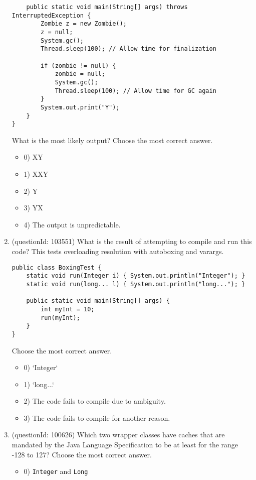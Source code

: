 \documentclass[12pt]{article}
\begin{document}
\begin{enumerate}[label=(\arabic*)]
\begin{verbatim}
    public static void main(String[] args) throws InterruptedException {
        Zombie z = new Zombie();
        z = null;
        System.gc();
        Thread.sleep(100); // Allow time for finalization

        if (zombie != null) {
            zombie = null;
            System.gc();
            Thread.sleep(100); // Allow time for GC again
        }
        System.out.print("Y");
    }
}
\end{verbatim}
What is the most likely output?
Choose the most correct answer. 
\begin{itemize}
\item 0) XY

\item 1) XXY

\item 2) Y

\item 3) YX

\item 4) The output is unpredictable.

\end{itemize}
\item (questionId: 103551) What is the result of attempting to compile and run this code? This tests overloading resolution with autoboxing and varargs.
\begin{verbatim}
public class BoxingTest {
    static void run(Integer i) { System.out.println("Integer"); }
    static void run(long... l) { System.out.println("long..."); }

    public static void main(String[] args) {
        int myInt = 10;
        run(myInt);
    }
}
\end{verbatim}
Choose the most correct answer. 
\begin{itemize}
\item 0) `Integer`

\item 1) `long...`

\item 2) The code fails to compile due to ambiguity.

\item 3) The code fails to compile for another reason.

\end{itemize}
\item (questionId: 100626) Which two wrapper classes have caches that are mandated by the Java Language Specification to be at least for the range -128 to 127?
Choose the most correct answer. 
\begin{itemize}
\item 0) \verb|Integer| and \verb|Long|


\end{itemize}
\end{enumerate}
\end{document}

